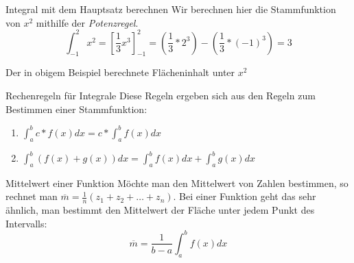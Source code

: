 \begin{bla}{Integral mit dem Hauptsatz berechnen}
  Wir berechnen hier die Stammfunktion von $x^2$ mithilfe der \emph{Potenzregel}.
  \begin{equation*}
    \int_{-1}^2 x^2={\left[\frac{1}{3}x^3\right]}_{-1}^2=\left(\frac{1}{3}*2^3\right)-\left(\frac{1}{3}*{(-1)}^3\right)=3
  \end{equation*}

  \begin{marginfigure}
    \caption{Der in obigem Beispiel berechnete Flächeninhalt unter $x^2$}
  \end{marginfigure}
\end{bla}

\clearpage
\begin{bla}{Rechenregeln für Integrale}
  Diese Regeln ergeben sich aus den Regeln zum Bestimmen einer Stammfunktion:
  \begin{enumerate}
    \item $\int_a^b c*f(x)dx = c*\int_a^b f(x)dx$
    \item $\int_a^b (f(x)+g(x))dx = \int_a^b f(x)dx + \int_a^b g(x)dx$
  \end{enumerate}
\end{bla}

\begin{bla}{Mittelwert einer Funktion}
  Möchte man den Mittelwert von Zahlen bestimmen, so rechnet man $\overline{m}=\frac{1}{n}(z_1+z_2+\dots+z_n)$. Bei einer Funktion geht das sehr ähnlich, man bestimmt den Mittelwert der Fläche unter jedem Punkt des Intervalls:
  \begin{equation*}
    \overline{m} = \frac{1}{b-a}\int_a^b f(x)dx
  \end{equation*}
\end{bla}



